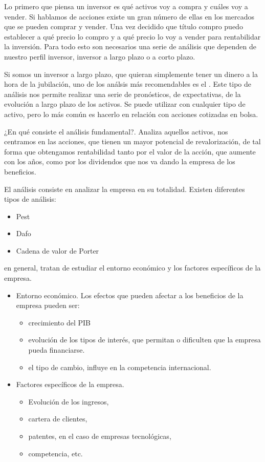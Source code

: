Lo primero que piensa un inversor es qué activos voy a compra y cuáles voy a vender. Si hablamos de acciones existe un gran número de ellas en los mercados que se pueden comprar y vender. Una vez decidido que título compro puedo establecer a qué precio lo compro y a qué precio lo voy a vender para rentabilidar la inversión. Para todo esto son necesarios una serie de análisis que dependen de nuestro perfil inversor, inversor a largo plazo o a corto plazo.

Si somos un inversor a largo plazo, que quieran simplemente tener un dinero a la hora de la jubilación, uno de los análsis más recomendables es el . Este tipo de análisis nos permite realizar una serie de pronósticos, de expectativas, de la evolución a largo plazo de los activos. Se puede utilizar con cualquier tipo de activo, pero lo más común es hacerlo en relación con acciones cotizadas en bolsa.

¿En qué consiste el análisis fundamental?. Analiza aquellos activos, nos centramos en las acciones, que tienen un mayor potencial de revalorización, de tal forma que obtengamos rentabilidad tanto por el valor de la acción, que aumente con los años, como por los dividendos que nos va dando la empresa de los beneficios.

El análisis consiste en analizar la empresa en su totalidad. Existen diferentes tipos de análisis:
\begin{itemize}
    \item Pest 
    \item Dafo 
    \item Cadena de valor de Porter
\end{itemize}
en general, tratan de estudiar el entorno económico y los factores específicos de la empresa.
\begin{itemize}
    \item Entorno económico. Los efectos que pueden afectar a los beneficios de la empresa pueden ser:
    \begin{itemize}
        \item crecimiento del PIB 
        \item evolución de los tipos de interés, que permitan o dificulten que la empresa pueda financiarse.
        \item el tipo de cambio, influye en la competencia internacional.
    \end{itemize}
    \item Factores específicos de la empresa.
    \begin{itemize}
        \item Evolución de los ingresos,
        \item cartera de clientes,
        \item patentes, en el caso de empresas tecnológicas,
        \item competencia, etc.
    \end{itemize}
\end{itemize}


